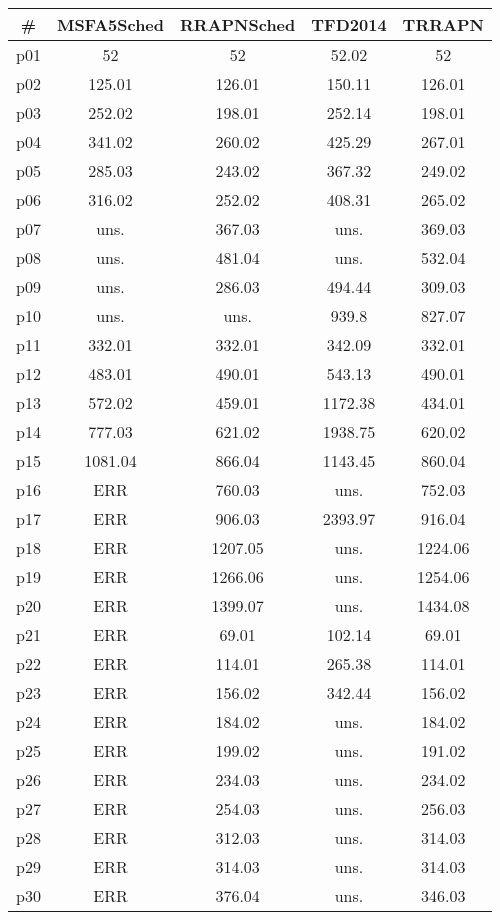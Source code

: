 \begin{tabular}{ccccc}
\toprule
\textbf{\#} & \textbf{MSFA5Sched} & \textbf{RRAPNSched} & \textbf{TFD2014} & \textbf{TRRAPN}\\
\midrule
p01 & 52 & 52 & 52.02 & 52\\
p02 & 125.01 & 126.01 & 150.11 & 126.01\\
p03 & 252.02 & 198.01 & 252.14 & 198.01\\
p04 & 341.02 & 260.02 & 425.29 & 267.01\\
p05 & 285.03 & 243.02 & 367.32 & 249.02\\
p06 & 316.02 & 252.02 & 408.31 & 265.02\\
p07 & uns. & 367.03 & uns. & 369.03\\
p08 & uns. & 481.04 & uns. & 532.04\\
p09 & uns. & 286.03 & 494.44 & 309.03\\
p10 & uns. & uns. & 939.8 & 827.07\\
p11 & 332.01 & 332.01 & 342.09 & 332.01\\
p12 & 483.01 & 490.01 & 543.13 & 490.01\\
p13 & 572.02 & 459.01 & 1172.38 & 434.01\\
p14 & 777.03 & 621.02 & 1938.75 & 620.02\\
p15 & 1081.04 & 866.04 & 1143.45 & 860.04\\
p16 & ERR & 760.03 & uns. & 752.03\\
p17 & ERR & 906.03 & 2393.97 & 916.04\\
p18 & ERR & 1207.05 & uns. & 1224.06\\
p19 & ERR & 1266.06 & uns. & 1254.06\\
p20 & ERR & 1399.07 & uns. & 1434.08\\
p21 & ERR & 69.01 & 102.14 & 69.01\\
p22 & ERR & 114.01 & 265.38 & 114.01\\
p23 & ERR & 156.02 & 342.44 & 156.02\\
p24 & ERR & 184.02 & uns. & 184.02\\
p25 & ERR & 199.02 & uns. & 191.02\\
p26 & ERR & 234.03 & uns. & 234.02\\
p27 & ERR & 254.03 & uns. & 256.03\\
p28 & ERR & 312.03 & uns. & 314.03\\
p29 & ERR & 314.03 & uns. & 314.03\\
p30 & ERR & 376.04 & uns. & 346.03\\
\bottomrule
\end{tabular}

